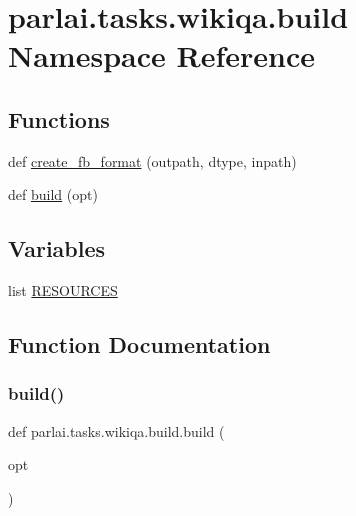 \hypertarget{namespaceparlai_1_1tasks_1_1wikiqa_1_1build}{}\section{parlai.\+tasks.\+wikiqa.\+build Namespace Reference}
\label{namespaceparlai_1_1tasks_1_1wikiqa_1_1build}
\subsection*{Functions}
\begin{DoxyCompactItemize}
\item 
def \hyperlink{namespaceparlai_1_1tasks_1_1wikiqa_1_1build_a554828702769592403db58c955d1dfe3}{create\+\_\+fb\+\_\+format} (outpath, dtype, inpath)
\item 
def \hyperlink{namespaceparlai_1_1tasks_1_1wikiqa_1_1build_a76f8aa9733d147ed1b5f2ec73a2bde07}{build} (opt)
\end{DoxyCompactItemize}
\subsection*{Variables}
\begin{DoxyCompactItemize}
\item 
list \hyperlink{namespaceparlai_1_1tasks_1_1wikiqa_1_1build_ae5b28b5acb8be66f26ddbf15bc4d92ec}{R\+E\+S\+O\+U\+R\+C\+ES}
\end{DoxyCompactItemize}


\subsection{Function Documentation}
\mbox{\label{namespaceparlai_1_1tasks_1_1wikiqa_1_1build_a76f8aa9733d147ed1b5f2ec73a2bde07}} 
\subsubsection{\texorpdfstring{build()}{build()}}
{\footnotesize\ttfamily def parlai.\+tasks.\+wikiqa.\+build.\+build (\begin{DoxyParamCaption}\item[{}]{opt }\end{DoxyParamCaption})}

